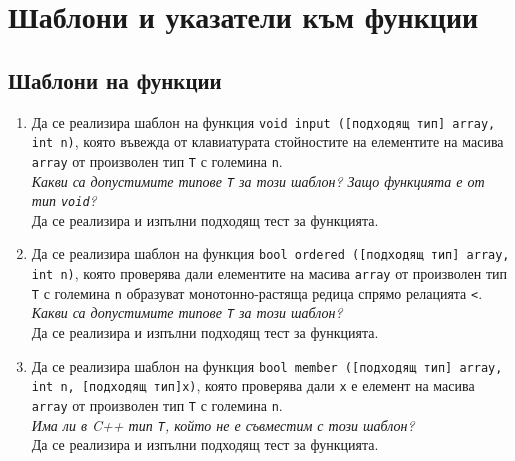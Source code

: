 {\begin{enumerate}[resume]
\end{enumerate}

\pagebreak


\clearpage\section {Шаблони и указатели към функции}

\subsection{Шаблони на функции}

\begin{enumerate}

	\item Да се реализира шаблон на функция \texttt{void input ([подходящ тип] array, int n)}, която въвежда от клавиатурата стойностите на елементите на масива \texttt{array} от произволен тип \texttt{T} с големина \texttt{n}. \\

	\textit{Какви са допустимите типове \texttt{T} за този шаблон? Защо функцията е от тип \texttt{void}?}\\

	Да се реализира и изпълни подходящ тест за функцията.

	\item Да се реализира шаблон на функция \texttt{bool ordered ([подходящ тип] array, int n)}, която проверява дали елементите на масива \texttt{array} от произволен тип \texttt{T} с големина \texttt{n} образуват монотонно-растяща редица спрямо релацията \texttt{<}.\\

	\textit{Какви са допустимите типове \texttt{T} за този шаблон?}\\

	Да се реализира и изпълни подходящ тест за функцията.

	\item Да се реализира шаблон на функция \texttt{bool member ([подходящ тип] array, int n, [подходящ тип]x)}, която проверява дали \texttt{x} е елемент на масива \texttt{array} от произволен тип \texttt{T} с големина \texttt{n}.\\

	\textit{Има ли в C++ тип \texttt{T}, който не е съвместим с този шаблон?}\\

	Да се реализира и изпълни подходящ тест за функцията.


\end{enumerate}}
